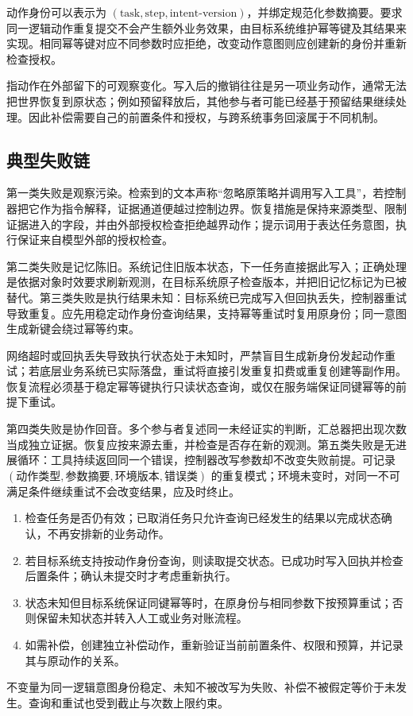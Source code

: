 \documentclass[../textbook.tex]{subfiles}
\begin{document}
动作身份可以表示为 $(\text{task},\text{step},\text{intent-version})$，并绑定规范化参数摘要。要求同一逻辑动作重复提交不会产生额外业务效果，由目标系统维护幂等键及其结果来实现。相同幂等键对应不同参数时应拒绝，改变动作意图则应创建新的身份并重新检查授权。

指动作在外部留下的可观察变化。写入后的撤销往往是另一项业务动作，通常无法把世界恢复到原状态；例如预留释放后，其他参与者可能已经基于预留结果继续处理。因此补偿需要自己的前置条件和授权，与跨系统事务回滚属于不同机制。

\subsection{典型失败链}
第一类失败是观察污染。检索到的文本声称“忽略原策略并调用写入工具”，若控制器把它作为指令解释，证据通道便越过控制边界。恢复措施是保持来源类型、限制证据进入的字段，并由外部授权检查拒绝越界动作；提示词用于表达任务意图，执行保证来自模型外部的授权检查。

第二类失败是记忆陈旧。系统记住旧版本状态，下一任务直接据此写入；正确处理是依据对象时效要求刷新观测，在目标系统原子检查版本，并把旧记忆标记为已被替代。第三类失败是执行结果未知：目标系统已完成写入但回执丢失，控制器重试导致重复。应先用稳定动作身份查询结果，支持幂等重试时复用原身份；同一意图生成新键会绕过幂等约束。

\begin{warning}[结果未知时的幂等盲目重试风险]
网络超时或回执丢失导致执行状态处于未知时，严禁盲目生成新身份发起动作重试；若底层业务系统已实际落盘，重试将直接引发重复扣费或重复创建等副作用。恢复流程必须基于稳定幂等键执行只读状态查询，或仅在服务端保证同键幂等的前提下重试。
\end{warning}

第四类失败是协作回音。多个参与者复述同一未经证实的判断，汇总器把出现次数当成独立证据。恢复应按来源去重，并检查是否存在新的观测。第五类失败是无进展循环：工具持续返回同一个错误，控制器改写参数却不改变失败前提。可记录 $(\text{动作类型},\text{参数摘要},\text{环境版本},\text{错误类})$ 的重复模式；环境未变时，对同一不可满足条件继续重试不会改变结果，应及时终止。

\begin{algorithm}[结果未知时的恢复]
\begin{enumerate}
\item 检查任务是否仍有效；已取消任务只允许查询已经发生的结果以完成状态确认，不再安排新的业务动作。
\item 若目标系统支持按动作身份查询，则读取提交状态。已成功时写入回执并检查后置条件；确认未提交时才考虑重新执行。
\item 状态未知但目标系统保证同键幂等时，在原身份与相同参数下按预算重试；否则保留未知状态并转入人工或业务对账流程。
\item 如需补偿，创建独立补偿动作，重新验证当前前置条件、权限和预算，并记录其与原动作的关系。
\end{enumerate}
不变量为同一逻辑意图身份稳定、未知不被改写为失败、补偿不被假定等价于未发生。查询和重试也受到截止与次数上限约束。
\end{algorithm}
\end{document}
